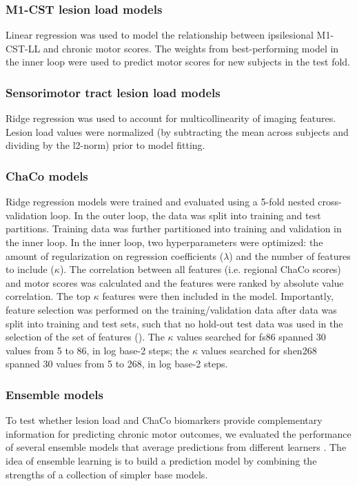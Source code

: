 \documentclass[10pt]{article}
\begin{document}
\subsubsection*{M1-CST lesion load models}
Linear regression was used to model the relationship between ipsilesional M1-CST-LL and chronic motor scores. The weights from best-performing model in the inner loop were used to predict motor scores for new subjects in the test fold. 

\subsubsection*{Sensorimotor tract lesion load models}
Ridge regression was used to account for multicollinearity of imaging features. Lesion load values were normalized (by subtracting the mean across subjects and dividing by the l2-norm) prior to model fitting.

\subsubsection*{ChaCo models}
Ridge regression models were trained and evaluated using a 5-fold nested cross-validation loop. In the outer loop, the data was split into training and test partitions. Training data was further partitioned into training and validation in the inner loop. In the inner loop, two hyperparameters were optimized: the amount of regularization on regression coefficients ($\lambda$) and the number of features to include ($\kappa$). The correlation between all features (i.e. regional ChaCo scores) and motor scores was calculated and the features were ranked by absolute value correlation. The top $\kappa$ features were then included in the model. Importantly, feature selection was performed on the training/validation data after data was split into training and test sets, such that no hold-out test data was used in the selection of the set of features (\cite{Hastie2001-or}). The $\kappa$ values searched for fs86 spanned 30 values from 5 to 86, in log base-2 steps; the $\kappa$ values searched for shen268 spanned 30 values from 5 to 268, in log base-2 steps. 


\subsubsection*{Ensemble models}
To test whether lesion load and ChaCo biomarkers provide complementary information for predicting chronic motor outcomes, we evaluated the performance of several ensemble models that average predictions from different learners \cite{Hastie2001-or}. The idea of ensemble learning is to build a prediction model by combining the strengths of a collection of simpler base models. 
\end{document}
